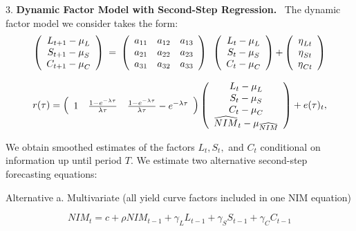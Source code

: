 \documentclass[12pt]{article}
\begin{document}
3. \textbf{Dynamic Factor Model with Second-Step Regression.} \ The dynamic
factor model we consider takes the form:
\bigskip
\begin{equation*}
\left(
\begin{array}{c}
{L_{t+1}-\mu _{L}} \\
{S_{t+1}-\mu _{S}} \\
{C_{t+1}-\mu _{C}}%
\end{array}%
\right) {\normalsize \ =\ }\left(
\begin{array}{ccc}
a_{11} & a_{12} & a_{13} \\
a_{21} & a_{22} & a_{23} \\
a_{31} & a_{32} & a_{33}%
\end{array}%
\right) {\normalsize \ }\left(
\begin{array}{c}
{L_{t}-\mu _{L}} \\
{S_{t}-\mu _{S}} \\
{C_{t}-\mu _{C}}%
\end{array}%
\right) {\normalsize +}\left(
\begin{array}{c}
{\eta _{Lt}} \\
{\eta _{St}} \\
{\eta _{Ct}}%
\end{array}%
\right)
\end{equation*}

\begin{equation*}
r(\tau )=\left(
\begin{array}{ccc}
1 & \frac{1-e^{-\lambda \tau }}{\lambda \tau } & \frac{1-e^{-\lambda \tau }}{%
\lambda \tau }-e^{-\lambda \tau }%
\end{array}%
\right) \left(
\begin{array}{c}
{L_{t}-\mu _{L}} \\
{S_{t}-\mu _{S}} \\
{C_{t}-\mu _{C}} \\
\widehat{NIM}_{t}-\mu _{\widehat{NIM}}%
\end{array}%
\right) +e(\tau )_{t},
\end{equation*}

We obtain smoothed estimates of the factors $L_{t},S_{t},$ and $C_{t}$
conditional on information up until period $T.$ We estimate two alternative
second-step forecasting equations:

\bigskip Alternative a. {\normalsize Multivariate (all yield curve factors
included in one NIM equation) }

\begin{equation*}
NIM_{t}=c+\rho NIM_{t-1}+\gamma _{L}L_{t-1}+\gamma _{S}S_{t-1}+\gamma
_{C}C_{t-1}
\end{equation*}
\end{document}
